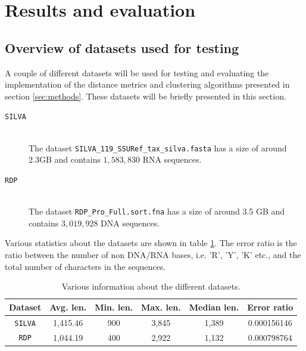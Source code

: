 \section{Results and evaluation} \label{sec:results}

\subsection{Overview of datasets used for testing}
\label{sec:overview_of_datasets}

A couple of different datasets will be used for testing and evaluating the
implementation of the distance metrics and clustering algorithms presented in
section \ref{sec:methods}. These datasets will be briefly presented in this
section.

\begin{description}
  \item[\texttt{SILVA}] \hfill \\
    The dataset \texttt{SILVA\_119\_SSURef\_tax\_silva.fasta} has a size of
    around 2.3GB and contains $1,583,830$ RNA sequences.

  \item[\texttt{RDP}] \hfill \\
    The dataset \texttt{RDP\_Pro\_Full.sort.fna} has a size of around 3.5 GB
    and contains $3,019,928$ DNA sequences.
\end{description}

Various statistics about the datasets are shown in table \ref{tab:data_stats}.
The error ratio is the ratio between the number of non DNA/RNA bases, i.e. 'R',
'Y', 'K' etc., and the total number of characters in the sequences.

\begin{table}[H]
  \centering
  \begin{tabular}{c |  c | c | c | c | c}
    Dataset        & Avg. len. & Min. len. & Max. len. & Median len. & Error ratio \\
    \hline
    \texttt{SILVA} & 1,415.46  & 900       & 3,845     & 1,389       & 0.000156146 \\
    \texttt{RDP}   & 1,044.19  & 400       & 2,922     & 1,132       & 0.000798764 \\
  \end{tabular}
  \caption{Various information about the different datasets.}
  \label{tab:data_stats}
\end{table}


